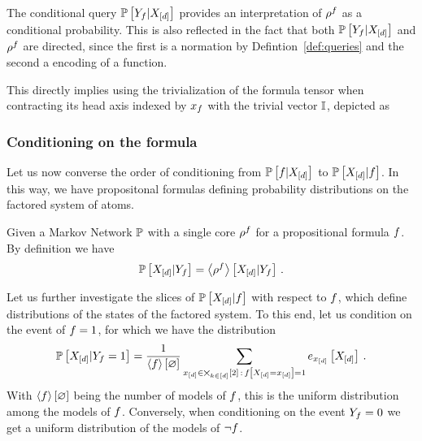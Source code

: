 The conditional query $\mathbb{P}\left[Y_{f}|X_{[d]}\right]$ provides an interpretation of $\rho^{f}$ as a conditional probability. 
This is also reflected in the fact that both $\mathbb{P}\left[Y_{f}|X_{[d]}\right]$ and $\rho^{f}$ are directed, since the first is a normation by Defintion~\ref{def:queries} and the second a encoding of a function.



This directly implies using   the trivialization of the formula tensor when contracting its head axis indexed by $x_{f}$ with the trivial vector $\mathbb{I}$, depicted as
\begin{center}
	
\end{center}



\subsubsection{Conditioning on the formula}

Let us now converse the order of conditioning from $\mathbb{P}\left[f|X_{[d]}\right]$ to $\mathbb{P}\left[X_{[d]}|f\right]$.
In this way, we have propositonal formulas defining probability distributions on the factored system of atoms.

Given a Markov Network $\mathbb{P}$ with a single core $\rho^{f}$ for a propositional formula $f$.
By definition we have
\begin{align*}
	\mathbb{P}\left[X_{[d]}|Y_{f}\right] 
	= \left\langle \rho^{f}\right\rangle \left[ X_{[d]} | Y_{f} \right] \, .  
\end{align*}
\begin{center}
	
\end{center}

Let us further investigate the slices of $\mathbb{P}\left[X_{[d]}|f\right]$ with respect to $f$, which define distributions of the states of the factored system.
To this end, let us condition on the event of $f=1$, for which we have the distribution
\begin{align}\label{eq:eventFormulaProb}
	\mathbb{P}\left[X_{[d]}|Y_{f}=1\right] = \frac{1}{\left\langle f\right\rangle \left[ \varnothing \right]} \sum_{x_{[d]}\in\bigtimes_{k\in[d]}[2] \, : \, f\left[X_{[d]}=x_{[d]}\right]=1} e_{x_{[d]}}\left[X_{[d]}\right] \, .
\end{align}
With $\left\langle f\right\rangle \left[ \varnothing \right]$ being the number of models of $f$,  this is the uniform distribution among the models of $f$.
Conversely, when conditioning on the event $Y_{f}=0$ we get a uniform distribution of the models of $\lnot f$.

